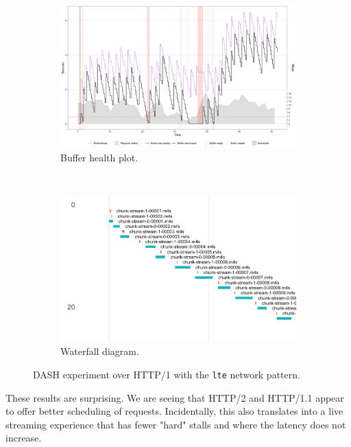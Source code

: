 \begin{figure}[h]
	\centering
	
	\begin{subfigure}[t]{0.45\textwidth}
		\centering
		\includegraphics[width=\textwidth]{res/eval_nonabr_lte_h1.png}
		\caption{Buffer health plot.}
		\label{fig:eval_nonabr_lte_h1_buffer}
	\end{subfigure}%
	~ 
	\begin{subfigure}[t]{0.45\textwidth}
		\centering
		\includegraphics[width=\textwidth]{res/eval_nonabr_lte_h1_waterfall.png}
		\caption{Waterfall diagram.}
		\label{fig:eval_nonabr_lte_h1_waterfall}
	\end{subfigure}
	
	\caption{DASH experiment over HTTP/1 with the \texttt{lte} network pattern.}
	\label{fig:eval_nonabr_lte_h1}
\end{figure}

These results are surprising. We are seeing that HTTP/2 and HTTP/1.1 appear to offer better scheduling of requests. Incidentally, this also translates into a live streaming experience that has fewer "hard" stalls and where the latency does not increase.


